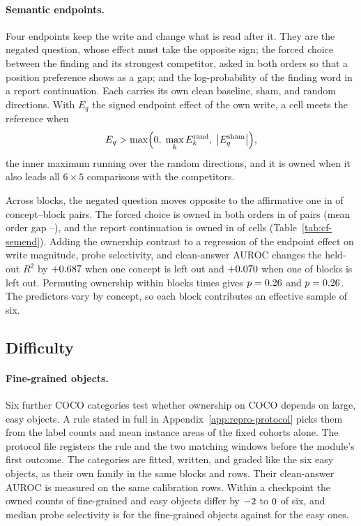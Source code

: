 \paragraph{Semantic endpoints.} Four endpoints keep the write and change what is read after it. They are the negated question, whose effect must take the opposite sign; the forced choice between the finding and its strongest competitor, asked in both orders so that a position preference shows as a gap; and the log-probability of the finding word in a report continuation. Each carries its own clean baseline, sham, and \cfSemLedgerRandom{} random directions. With $E_q$ the signed endpoint effect of the own write, a cell meets the reference when
\begin{equation}
E_q>\max\Bigl(0,\;\max_{k}E^{\mathrm{rand}}_{k},\;\bigl|E^{\mathrm{sham}}_q\bigr|\Bigr),
\label{eq:endpoint-reference}
\end{equation}
the inner maximum running over the \cfSemLedgerRandom{} random directions, and it is owned when it also leads all $6\times5$ comparisons with the competitors.

Across \cfSemBlocks{} blocks, the negated question moves opposite to the affirmative one in \cfSemNegOpposite{} of \cfSemNegN{} concept--block pairs. The forced choice is owned in both orders in \cfSemForcedOwned{} of \cfSemForcedN{} pairs (mean order gap \cfSemGapMin{}--\cfSemGapMax{}), and the report continuation is owned in \cfSemReportOwned{} of \cfSemReportCells{} cells (Table~\ref{tab:cf-semend}). Adding the ownership contrast to a regression of the endpoint effect on write magnitude, probe selectivity, and clean-answer AUROC changes the held-out $R^2$ by $+0.687$ when one concept is left out and $+0.070$ when one of \cfSemCvBlocks{} blocks is left out. Permuting ownership within blocks \cfSemCvPerms{} times gives $p=0.26$ and $p=0.26$. The predictors vary by concept, so each block contributes an effective sample of six.



\subsection{Difficulty}
\label{app:cf-difficulty}

\paragraph{Fine-grained objects.} Six further COCO categories test whether ownership on COCO depends on large, easy objects. A rule stated in full in Appendix~\ref{app:repro-protocol} picks them from the label counts and mean instance areas of the fixed cohorts alone. The protocol file registers the rule and the two matching windows before the module's first outcome. The categories are fitted, written, and graded like the six easy objects, as their own family in the same blocks and rows. Their clean-answer AUROC is measured on the same calibration rows. Within a checkpoint the owned counts of fine-grained and easy objects differ by $-2$ to $0$ of six, and median probe selectivity is \cfFgFineSel{} for the fine-grained objects against \cfFgEasySameSel{} for the easy ones.

